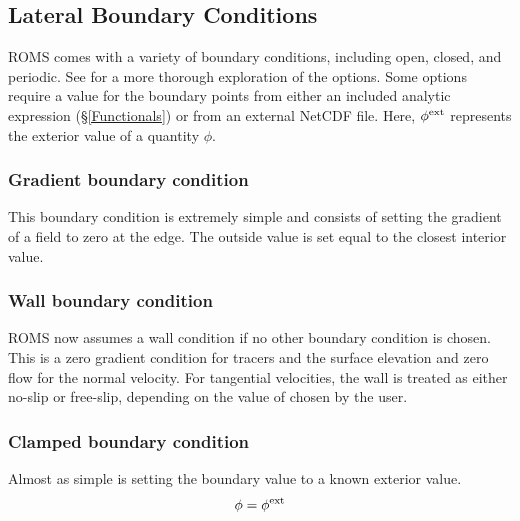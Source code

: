 


\subsection{Lateral Boundary Conditions}
\label{HBC}
ROMS comes with a variety of boundary conditions, including open,
closed, and periodic. See
\citet{Marchesiello2001} for a more thorough exploration of the
options. Some options require a value for the boundary points
from either an included analytic expression (\S\ref{Functionals})
or from an external NetCDF file. Here, $\phi^{\rm ext}$ represents
the exterior value of a quantity $\phi$.

\subsubsection{Gradient boundary condition}
This boundary condition is extremely simple and consists of setting the
gradient of a field to zero at the edge. The outside value is set equal
to the closest interior value.

\subsubsection{Wall boundary condition}
ROMS now assumes a wall condition if no other boundary condition is
chosen. This is a zero gradient condition for tracers and the
surface elevation and zero flow for the normal velocity. For
tangential velocities, the wall is treated as either no-slip or
free-slip, depending on the value of  chosen by the
user.

\subsubsection{Clamped boundary condition}
Almost as simple is setting the boundary value to a known exterior
value.
\begin{equation}
   \phi = \phi^{\rm ext}
\end{equation}

